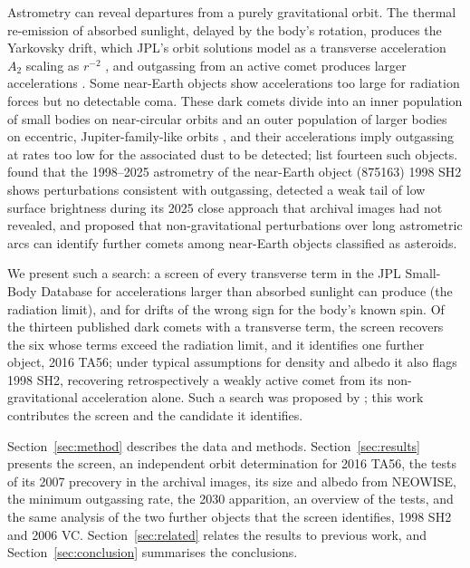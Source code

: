 \documentclass[3p,11pt]{elsarticle}
\begin{document}
Astrometry can reveal departures from a purely gravitational orbit. The thermal
re-emission of absorbed sunlight, delayed by the body's rotation, produces the Yarkovsky
drift, which JPL's orbit solutions model as a transverse acceleration $A_2$ scaling as
$r^{-2}$ \citep{Farnocchia2013}, and outgassing from an active comet produces larger
accelerations \citep{Marsden1973}. Some near-Earth objects show accelerations too large for
radiation forces but no detectable coma. These dark comets \citep{Seligman2023} divide into
an inner population of small bodies on near-circular orbits and an outer population of
larger bodies on eccentric, Jupiter-family-like orbits \citep{Seligman2024}, and their
accelerations imply outgassing at rates too low for the associated dust to be detected;
\citet{Seligman2024} list fourteen such objects. \citet{Farnocchia2026} found
that the 1998--2025 astrometry of the near-Earth object (875163) 1998 SH2 shows
perturbations consistent with outgassing, detected a weak tail of low surface brightness
during its 2025 close approach that archival images had not revealed, and proposed that
non-gravitational perturbations over long astrometric arcs can identify further comets
among near-Earth objects classified as asteroids.

We present such a search: a screen of every transverse term in the JPL Small-Body
Database for accelerations larger than absorbed sunlight can produce (the radiation
limit), and for drifts of the wrong sign for the body's known spin. Of the thirteen
published dark comets with a transverse term, the screen recovers the six whose terms
exceed the radiation limit, and it identifies one further object, 2016 TA56; under typical
assumptions for density and albedo it also flags 1998 SH2, recovering retrospectively a
weakly active comet from its non-gravitational acceleration alone. Such a search was
proposed by \citet{Farnocchia2026}; this work contributes the screen and
the candidate it identifies.

Section~\ref{sec:method} describes the data and methods. Section~\ref{sec:results} presents
the screen, an independent orbit determination for 2016 TA56, the tests of its 2007
precovery in the archival images, its size and albedo from NEOWISE, the minimum outgassing
rate, the 2030 apparition, an overview of the tests, and the same analysis of the two
further objects that the screen identifies, 1998 SH2 and 2006 VC.
Section~\ref{sec:related} relates the results to previous work, and
Section~\ref{sec:conclusion} summarises the conclusions.
\end{document}
